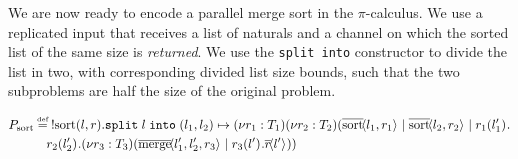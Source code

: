 


We are now ready to encode a parallel merge sort in the $\pi$-calculus. We use a replicated input that receives a list of naturals and a channel on which the sorted list of the same size is \textit{returned}. We use the \texttt{split into} constructor to divide the list in two, with corresponding divided list size bounds, such that the two subproblems are half the size of the original problem. 

\begin{align*}
    &P_{\text{sort}} \defeq\; !\text{sort}(l, r).\texttt{split}\; l\; \texttt{into}\; (l_1,l_2) \mapsto \newvar{r_1 : T_1}{\newvar{r_2 : T_2}{(\asyncoutputch{\text{sort}}{l_1,r_1}{} \mid \asyncoutputch{\text{sort}}{l_2,r_2}{} \mid \inputch{r_1}{l_1'}{}{\\
    &\kern3em\inputch{r_2}{l_2'}{}{\newvar{r_3 : T_3}{(\asyncoutputch{\text{merge}}{l_1',l_2',r_3}{} \mid \inputch{r_3}{l'}{}{\asyncoutputch{r}{l'}{}})}}} )}}
%  
\end{align*}

